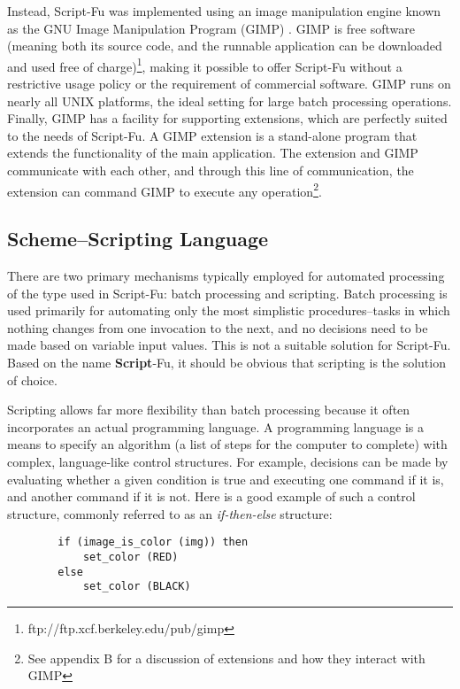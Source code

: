 \documentclass{article}
\begin{document}
Instead, Script-Fu was implemented using an image manipulation engine
known as the GNU Image Manipulation Program (GIMP) \cite{GIMP}.  GIMP
is free software (meaning both its source code, and the runnable
application can be downloaded and used free of
charge)\footnote{ftp://ftp.xcf.berkeley.edu/pub/gimp}, making it
possible to offer Script-Fu without a restrictive usage policy or the
requirement of commercial software.  GIMP runs on nearly all UNIX
platforms, the ideal setting for large batch processing operations.
Finally, GIMP has a facility for supporting extensions, which are
perfectly suited to the needs of Script-Fu.  A GIMP extension is a
stand-alone program that extends the functionality of the main
application.  The extension and GIMP communicate with each other, and
through this line of communication, the extension can command GIMP to
execute any operation\footnote{See appendix B for a discussion of
extensions and how they interact with GIMP}.

\subsection{Scheme--Scripting Language}

There are two primary mechanisms typically employed for automated
processing of the type used in Script-Fu: batch processing and
scripting.  Batch processing is used primarily for automating only the
most simplistic procedures--tasks in which nothing changes from one
invocation to the next, and no decisions need to be made based on
variable input values.  This is not a suitable solution for Script-Fu.
Based on the name {\bf Script}-Fu, it should be obvious that scripting
is the solution of choice.

Scripting allows far more flexibility than batch processing because it
often incorporates an actual programming language.  A programming
language is a means to specify an algorithm (a list of steps for the
computer to complete) with complex, language-like control structures.
For example, decisions can be made by evaluating whether a given
condition is true and executing one command if it is, and another
command if it is not.  Here is a good example of such a control
structure, commonly referred to as an {\it if-then-else} structure:

{\scriptsize
\begin{verbatim}
        if (image_is_color (img)) then
            set_color (RED)
        else
            set_color (BLACK)
\end{verbatim}}
\end{document}
